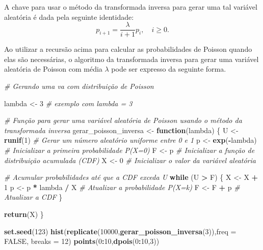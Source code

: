 \documentclass[
]{book}
\newenvironment{Shaded}{\begin{snugshade}}{\end{snugshade}}
\newcommand{\AttributeTok}[1]{\textcolor[rgb]{0.13,0.29,0.53}{#1}}
\newcommand{\CommentTok}[1]{\textcolor[rgb]{0.56,0.35,0.01}{\textit{#1}}}
\newcommand{\ConstantTok}[1]{\textcolor[rgb]{0.56,0.35,0.01}{#1}}
\newcommand{\ControlFlowTok}[1]{\textcolor[rgb]{0.13,0.29,0.53}{\textbf{#1}}}
\newcommand{\DecValTok}[1]{\textcolor[rgb]{0.00,0.00,0.81}{#1}}
\newcommand{\FunctionTok}[1]{\textcolor[rgb]{0.13,0.29,0.53}{\textbf{#1}}}
\newcommand{\NormalTok}[1]{#1}
\newcommand{\OtherTok}[1]{\textcolor[rgb]{0.56,0.35,0.01}{#1}}
\newcommand{\SpecialCharTok}[1]{\textcolor[rgb]{0.81,0.36,0.00}{\textbf{#1}}}
\begin{document}
A chave para usar o método da transformada inversa para gerar uma tal
variável aleatória é dada pela seguinte identidade:
\[p_{i+1}=\frac{\lambda}{i+1}p_{i}, \quad i\geq 0.\]

Ao utilizar a recursão acima para calcular as probabilidades de Poisson
quando elas são necessárias, o algoritmo da transformada inversa para
gerar uma variável aleatória de Poisson com média \(\lambda\) pode ser
expresso da seguinte forma.

\begin{Shaded}
\begin{Highlighting}[]
\CommentTok{\# Gerando uma va com distribuição de Poisson}

\NormalTok{lambda }\OtherTok{\textless{}{-}} \DecValTok{3}  \CommentTok{\# exemplo com lambda = 3}

\CommentTok{\# Função para gerar uma variável aleatória de Poisson usando o método da transformada inversa}
\NormalTok{gerar\_poisson\_inversa }\OtherTok{\textless{}{-}} \ControlFlowTok{function}\NormalTok{(lambda) \{}
\NormalTok{  U }\OtherTok{\textless{}{-}} \FunctionTok{runif}\NormalTok{(}\DecValTok{1}\NormalTok{)  }\CommentTok{\# Gerar um número aleatório uniforme entre 0 e 1}
\NormalTok{  p }\OtherTok{\textless{}{-}} \FunctionTok{exp}\NormalTok{(}\SpecialCharTok{{-}}\NormalTok{lambda)  }\CommentTok{\# Inicializar a primeira probabilidade P(X=0)}
\NormalTok{  F }\OtherTok{\textless{}{-}}\NormalTok{ p  }\CommentTok{\# Inicializar a função de distribuição acumulada (CDF)}
\NormalTok{  X }\OtherTok{\textless{}{-}} \DecValTok{0}  \CommentTok{\# Inicializar o valor da variável aleatória}
  
  \CommentTok{\# Acumular probabilidades até que a CDF exceda U}
  \ControlFlowTok{while}\NormalTok{ (U }\SpecialCharTok{\textgreater{}}\NormalTok{ F) \{}
\NormalTok{    X }\OtherTok{\textless{}{-}}\NormalTok{ X }\SpecialCharTok{+} \DecValTok{1}
\NormalTok{    p }\OtherTok{\textless{}{-}}\NormalTok{ p }\SpecialCharTok{*}\NormalTok{ lambda }\SpecialCharTok{/}\NormalTok{ X  }\CommentTok{\# Atualizar a probabilidade P(X=k)}
\NormalTok{    F }\OtherTok{\textless{}{-}}\NormalTok{ F }\SpecialCharTok{+}\NormalTok{ p  }\CommentTok{\# Atualizar a CDF}
\NormalTok{  \}}
  
  \FunctionTok{return}\NormalTok{(X)}
\NormalTok{\}}

\FunctionTok{set.seed}\NormalTok{(}\DecValTok{123}\NormalTok{)}
\FunctionTok{hist}\NormalTok{(}\FunctionTok{replicate}\NormalTok{(}\DecValTok{10000}\NormalTok{,}\FunctionTok{gerar\_poisson\_inversa}\NormalTok{(}\DecValTok{3}\NormalTok{)),}\AttributeTok{freq =} \ConstantTok{FALSE}\NormalTok{, }\AttributeTok{breaks =} \DecValTok{12}\NormalTok{)}
\FunctionTok{points}\NormalTok{(}\DecValTok{0}\SpecialCharTok{:}\DecValTok{10}\NormalTok{,}\FunctionTok{dpois}\NormalTok{(}\DecValTok{0}\SpecialCharTok{:}\DecValTok{10}\NormalTok{,}\DecValTok{3}\NormalTok{))}
\end{Highlighting}
\end{Shaded}
\end{document}

